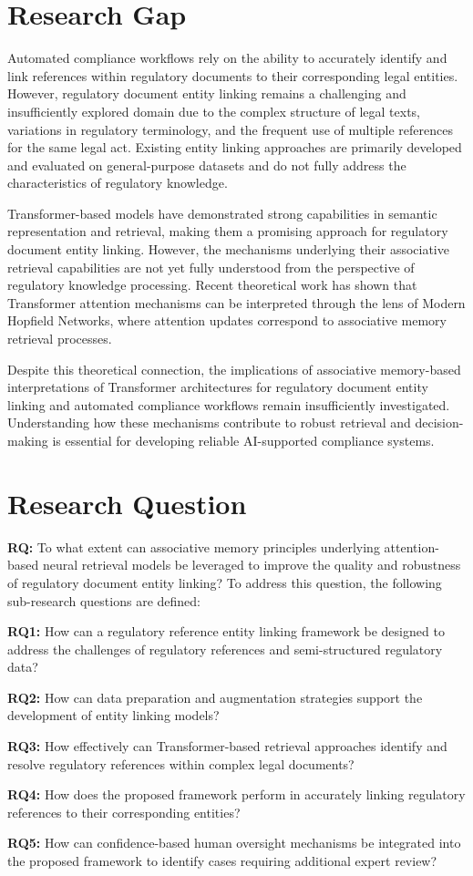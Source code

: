\section{Research Gap}

Automated compliance workflows rely on the ability to accurately identify and link references within regulatory documents to their corresponding legal entities. However, regulatory document entity linking remains a challenging and insufficiently explored domain due to the complex structure of legal texts, variations in regulatory terminology, and the frequent use of multiple references for the same legal act. Existing entity linking approaches are primarily developed and evaluated on general-purpose datasets and do not fully address the characteristics of regulatory knowledge.

Transformer-based models have demonstrated strong capabilities in semantic representation and retrieval, making them a promising approach for regulatory document entity linking. However, the mechanisms underlying their associative retrieval capabilities are not yet fully understood from the perspective of regulatory knowledge processing. Recent theoretical work has shown that Transformer attention mechanisms can be interpreted through the lens of Modern Hopfield Networks, where attention updates correspond to associative memory retrieval processes.

Despite this theoretical connection, the implications of associative memory-based interpretations of Transformer architectures for regulatory document entity linking and automated compliance workflows remain insufficiently investigated. Understanding how these mechanisms contribute to robust retrieval and decision-making is essential for developing reliable AI-supported compliance systems.

\section{Research Question}

\textbf{RQ:} To what extent can associative memory principles underlying attention-based neural retrieval models be leveraged to improve the quality and robustness of regulatory document entity linking?
To address this question, the following sub-research questions are defined:

\textbf{RQ1:} How can a regulatory reference entity linking framework be designed to address the challenges of regulatory references and semi-structured regulatory data?

\textbf{RQ2:} How can data preparation and augmentation strategies support the development of entity linking models?

\textbf{RQ3:} How effectively can Transformer-based retrieval approaches identify and resolve regulatory references within complex legal documents?

\textbf{RQ4:} How does the proposed framework perform in accurately linking regulatory references to their corresponding entities?

\textbf{RQ5:} How can confidence-based human oversight mechanisms be integrated into the proposed framework to identify cases requiring additional expert review?